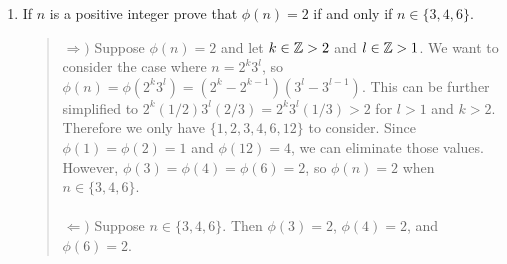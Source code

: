 \documentclass{hw}
\begin{document}
\begin{enumerate}
\item If $n$ is a positive integer prove that $\phi(n)=2$ if and only if $n\in\{ 3,4,6\}$.
\begin{quote}
$\Rightarrow)$ Suppose $\phi(n)=2$ and let $k\in\mathbb{Z} > 2$ and $l\in\mathbb{Z} > 1$. We want to consider the
case where $n=2^k3^l$, so $\phi(n)=\phi(2^k3^l)=(2^k-2^{k-1})(3^l-3^{l-1})$. This can be further
simplified to $2^k(1/2)3^l(2/3)=2^k3^l(1/3)>2$ for $l>1$ and $k>2$. Therefore we only have
$\{ 1,2,3,4,6,12 \}$ to consider. Since $\phi(1)=\phi(2)=1$ and $\phi(12)=4$, we can eliminate
those values. However, $\phi(3)=\phi(4)=\phi(6)=2$, so $\phi(n)=2$ when $n\in\{ 3,4,6\}$.
\noindent\\\\
$\Leftarrow)$ Suppose $n\in\{ 3,4,6\}$. Then $\phi(3)=2$, $\phi(4)=2$, and $\phi(6)=2$.
\end{quote}
\end{enumerate}
\end{document}
